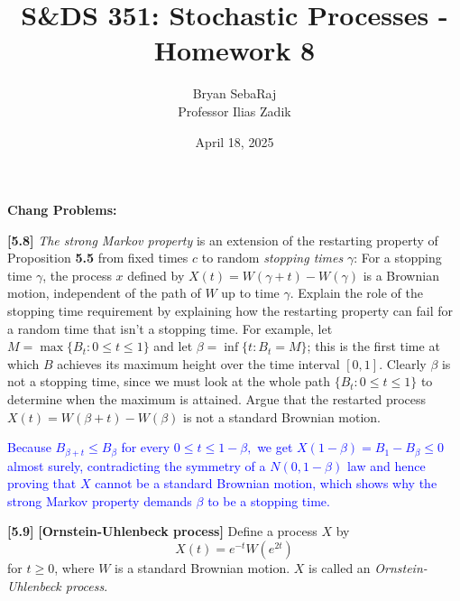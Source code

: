 \documentclass{article}
\title{S\&DS 351: Stochastic Processes - Homework 8}
\author{Bryan SebaRaj \\[0.8em] Professor Ilias Zadik}
\date{April 18, 2025}
\begin{document}
\maketitle

\textbf{Chang Problems:}

\textbf{[5.8]} \textit{The strong Markov property} is an extension of
the restarting property of Proposition \textbf{5.5} from fixed times
$c$ to random \textit{stopping times} $\gamma$: For a stopping time
$\gamma$, the process $x$ defined by $X(t) = W(\gamma + t) -
W(\gamma)$ is a Brownian motion, independent of the path of $W$ up to
time $\gamma$. Explain the role of the stopping time requirement by
explaining how the restarting property can fail for a random time
that isn’t a stopping time. For example, let $M = \max\{B_t : 0 \leq
t \leq 1\}$ and let $\beta = \inf\{t : B_t = M\}$; this is the first
time at which $B$ achieves its maximum height over the time interval
$[0,1]$. Clearly $\beta$ is not a stopping time, since we must look
at the whole path $\{B_t : 0 \leq t \leq 1\}$ to determine when the
maximum is attained. Argue that the restarted process $X(t) = W(\beta
+ t) - W(\beta)$ is not a standard Brownian motion.


\textcolor{blue}{ Because $B_{\beta+t}\le B_\beta$ for every $0\le
    t\le 1-\beta,$ we get $X(1-\beta)=B_1-B_\beta\le 0$ almost
    surely, contradicting the symmetry of a $N(0,1-\beta)$ law and
    hence proving that $X$ cannot be a standard Brownian motion,
    which shows why the strong Markov property demands $\beta$ to be
    a stopping time. }

\textbf{[5.9]} \textbf{[Ornstein-Uhlenbeck process]} Define a process $X$ by
\[
X(t) = e^{-t}W(e^{2t})
\]
for $t \geq 0$, where $W$ is a standard Brownian motion. $X$ is called an \textit{Ornstein-Uhlenbeck process}.
\end{document}
